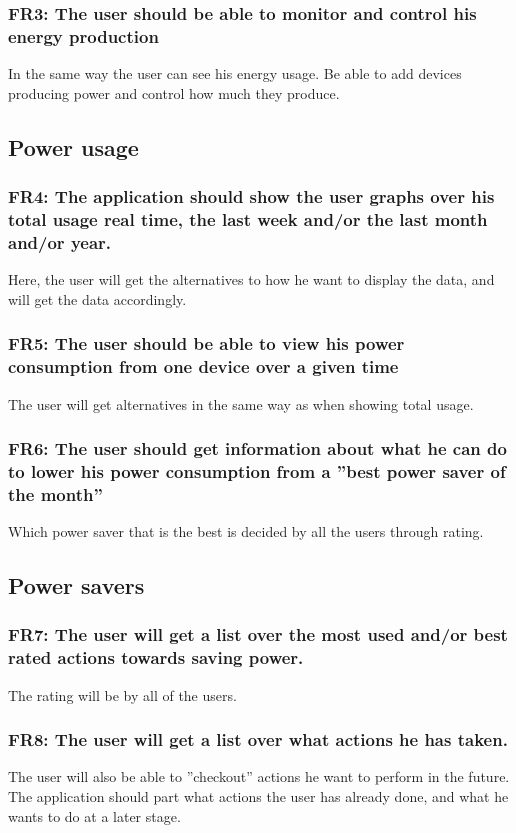 \subsubsection{FR3: The user should be able to monitor and control his energy production}
In the same way the user can see his energy usage. Be able to add devices producing power and control how much they produce.


\subsection{Power usage}
\subsubsection{FR4: The application should show the user graphs over his total usage real time, the last week and/or the last month and/or year.}
Here, the user will get the alternatives to how he want to display the data, and will get the data accordingly.

\subsubsection{FR5: The user should be able to view his power consumption from one device over a given time}
The user will get alternatives in the same way as when showing total usage.

\subsubsection{FR6: The user should get information about what he can do to lower his power consumption from a ''best power saver of the month''}
 Which power saver that is the best is decided by all the users through rating.

\subsection{Power savers}

\subsubsection{FR7: The user will get a list over the most used and/or best rated actions towards saving power.}
The rating will be by all of the users.

\subsubsection{FR8: The user will get a list over what actions he has taken.}
The user will also be able to ''checkout'' actions he want to perform in the future. The application should part what actions the user has already done, and what he wants to do at a later stage.

